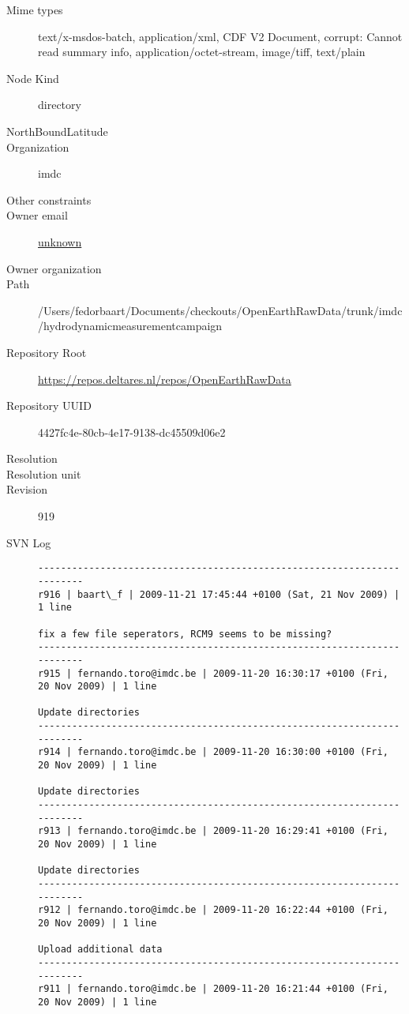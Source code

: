 \documentclass[9]{report}
\begin{document}
\begin{description}
  \item[Mime types] text/x-msdos-batch, application/xml, CDF V2 Document, corrupt: Cannot read summary info, application/octet-stream, image/tiff, text/plain
  \item[Node Kind] directory
  \item[NorthBoundLatitude] 
  \item[Organization] imdc
  \item[Other constraints] 
  \item[Owner email] \href{mailto:unknown}{unknown}
  \item[Owner organization] 
  \item[Path] /Users/fedorbaart/Documents/checkouts/OpenEarthRawData/trunk/imdc/hydrodynamicmeasurementcampaign
  \item[Repository Root] \href{https://repos.deltares.nl/repos/OpenEarthRawData}{https://repos.deltares.nl/repos/OpenEarthRawData}
  \item[Repository UUID] 4427fc4e-80cb-4e17-9138-dc45509d06e2
  \item[Resolution] 
  \item[Resolution unit] 
  \item[Revision] 919
  \item[SVN Log] \begin{verbatim}
------------------------------------------------------------------------
r916 | baart\_f | 2009-11-21 17:45:44 +0100 (Sat, 21 Nov 2009) | 1 line

fix a few file seperators, RCM9 seems to be missing?
------------------------------------------------------------------------
r915 | fernando.toro@imdc.be | 2009-11-20 16:30:17 +0100 (Fri, 20 Nov 2009) | 1 line

Update directories
------------------------------------------------------------------------
r914 | fernando.toro@imdc.be | 2009-11-20 16:30:00 +0100 (Fri, 20 Nov 2009) | 1 line

Update directories
------------------------------------------------------------------------
r913 | fernando.toro@imdc.be | 2009-11-20 16:29:41 +0100 (Fri, 20 Nov 2009) | 1 line

Update directories
------------------------------------------------------------------------
r912 | fernando.toro@imdc.be | 2009-11-20 16:22:44 +0100 (Fri, 20 Nov 2009) | 1 line

Upload additional data
------------------------------------------------------------------------
r911 | fernando.toro@imdc.be | 2009-11-20 16:21:44 +0100 (Fri, 20 Nov 2009) | 1 line


\end{verbatim}
\end{description}
\end{document}
